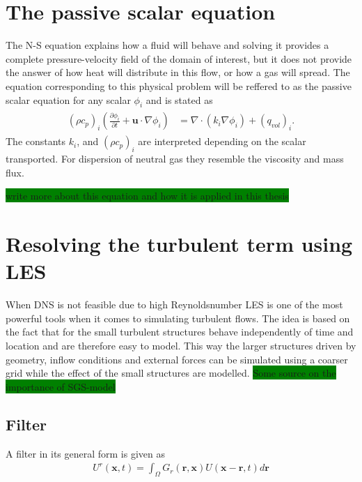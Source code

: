 \section{The passive scalar equation}
The N-S equation explains how a fluid will behave and solving it provides a complete pressure-velocity field of the 
domain of interest, but it does not provide the answer of how heat will distribute in this flow, or how a gas will spread.
The equation corresponding to this physical problem will be reffered to as the passive scalar equation for any scalar 
$\phi_i$ and is stated as 
\begin{align}
    \begin{split}
        (\rho c_p)_i(\frac{\partial \phi_i}{\partial t} + \mathbf{u}\cdot \nabla\phi_i) 
        &= \nabla \cdot(k_i\nabla \phi_i)+ (q_{vol})_i.
    \end{split}
	\label{eq:PS}
\end{align}
The constants  $k_i$, and $(\rho c_p)_i$ are interpreted depending on 
the scalar transported. For dispersion of neutral gas they 
resemble the viscosity and mass flux. 

\colorbox{green}{write more about this equation and how it is applied in this thesis}
\section{Resolving the turbulent term using LES}
When DNS is not feasible due to high Reynoldsnumber LES is one of the most powerful tools when it comes to simulating turbulent flows.
The idea is based on the fact that for the small turbulent structures behave independently of time and location and are therefore 
easy to model. This way the larger structures driven by geometry, inflow conditions and external forces can be simulated using a coarser 
grid while the effect of the small structures are modelled. \colorbox{green}{Some source on the importance of SGS-model}

\subsection{Filter}
A filter in its general form is given as 
\begin{align}
    U^r(\mathbf{x},t) = \int_{\Omega} G_r(\mathbf{r},\mathbf{x})U(\mathbf{x}-\mathbf{r},t)d\mathbf{r}
    \label{eq:filter}
\end{align}

